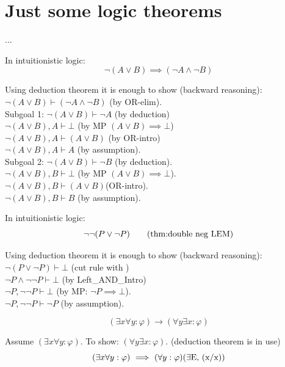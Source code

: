 \section{Just some logic theorems}
...
\begin{theorem}
In intuitionistic logic:
\[
\neg (A\lor B) \implies (\neg A\land\neg B)
\]
\end{theorem}
\Proof
Using deduction theorem it is enough to show (backward reasoning):\\
$\neg (A\lor B) \vdash (\neg A\land\neg B)$ (by OR-elim).\\
Subgoal 1: $\neg (A\lor B) \vdash \neg A$ (by deduction)\\
$\neg (A\lor B), A \vdash \bot$ (by MP $(A\lor B)\implies\bot$)\\
$\neg (A\lor B), A \vdash (A\lor B)$ (by OR-intro)\\
$\neg (A\lor B), A \vdash A$ (by assumption).\\
Subgoal 2: $\neg (A\lor B) \vdash \neg B$ (by deduction).\\
$\neg (A\lor B), B \vdash \bot$ (by MP $(A\lor B)\implies\bot$).\\
$\neg (A\lor B), B \vdash (A\lor B)$(OR-intro).\\
$\neg (A\lor B), B \vdash B$ (by assumption).\\
\Done

\begin{theorem} In intuitionistic logic:\\
\[
\neg\neg (P\lor\neg P)
\labeltagd{thm}{double neg LEM}
\]
\end{theorem}
\Proof
Using deduction theorem it is enough to show (backward reasoning):\\
$\neg (P\lor\neg P) \vdash \bot$ (cut rule with )\\
$\neg P\land\neg\neg P \vdash \bot$ (by Left\_AND\_Intro)\\
$\neg P, \neg\neg P \vdash \bot$ (by MP: $\neg P \implies \bot$).\\
$\neg P, \neg\neg P \vdash \neg P$ (by assumption).\\
\Done

\iffalse
\begin{theorem}
\[
(\exists x \forall y:\varphi) \longrightarrow (\forall y \exists x :\varphi)
\]
\end{theorem}
\Proof
Assume $(\exists x \forall y:\varphi)$. To show: $(\forall y \exists x :\varphi)$. (deduction theorem is in use)
\[
(\exists x \forall y:\varphi)
\ \Longrightarrow\ 
(\forall y:\varphi)
\mbox{($\exists$E, (x/x))}
\]


